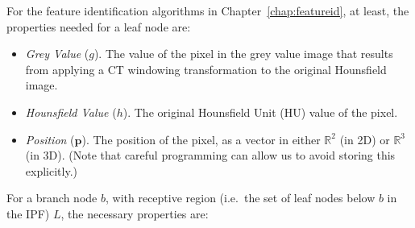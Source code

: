 For the feature identification algorithms in Chapter~\ref{chap:featureid}, at least, the properties needed for a leaf node are:

\begin{itemize}

\item \emph{Grey Value} ($g$). The value of the pixel in the grey value image that results from applying a CT windowing transformation to the original Hounsfield image.

\item \emph{Hounsfield Value} ($h$). The original Hounsfield Unit (HU) value of the pixel.

\item \emph{Position} ($\mathbf{p}$). The position of the pixel, as a vector in either $\mathbb{R}^2$ (in 2D) or $\mathbb{R}^3$ (in 3D). (Note that careful programming can allow us to avoid storing this explicitly.)

\end{itemize}

\noindent For a branch node $b$, with receptive region (i.e.~the set of leaf nodes below $b$ in the IPF) $L$, the necessary properties are:


